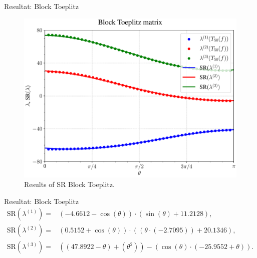 \documentclass{beamer}
\begin{document}
\begin{frame}{Resultat: Block Toeplitz}
    \begin{figure}[H]
    \centering
    \includegraphics[width=0.5\linewidth]{images/Block_results.pdf}
    \caption{Results of SR Block Toeplitz.}
    \label{fig:Block Toepltix results}
    \end{figure}
\end{frame}
\begin{frame}{Resultat: Block Toeplitz}
    \begin{align}
    \text{SR}(\lambda^{(1)})=&(-4.6612 - \cos(\theta)) \cdot (\sin(\theta) + 11.2128),\label{eq: Block result 1}\\
    \text{SR}(\lambda^{(2)})=&(0.5152 + \cos(\theta)) \cdot ((\theta \cdot (-2.7095)) +20.1346),\label{eq: Block result 2}\\
    \text{SR}(\lambda^{(3)})=&((47.8922 - \theta) + (\theta^2)) - (\cos(\theta) \cdot (-25.9552 + \theta)).
    \label{eq: Block result 3}
    \end{align}
\end{frame}
\end{document}
